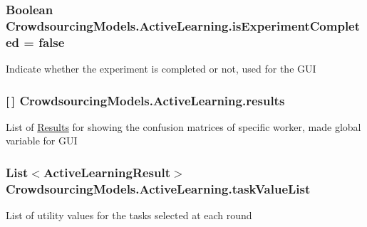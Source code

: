 \subsubsection[{is\+Experiment\+Completed}]{\setlength{\rightskip}{0pt plus 5cm}Boolean Crowdsourcing\+Models.\+Active\+Learning.\+is\+Experiment\+Completed = false\hspace{0.3cm}{\ttfamily [static]}}\label{class_crowdsourcing_models_1_1_active_learning_ac658e48a670fa0f0b7896cf8e2648556}


Indicate whether the experiment is completed or not, used for the G\+U\+I 

\hypertarget{class_crowdsourcing_models_1_1_active_learning_a4f3abbe012947f48a2476130e2dd9d1e}{}
\subsubsection[{results}]{ \mbox{[}$\,$\mbox{]} Crowdsourcing\+Models.\+Active\+Learning.\+results\hspace{0.3cm}{\ttfamily [static]}}\label{class_crowdsourcing_models_1_1_active_learning_a4f3abbe012947f48a2476130e2dd9d1e}


List of \hyperlink{class_crowdsourcing_models_1_1_results}{Results} for showing the confusion matrices of specific worker, made global variable for G\+U\+I 

\hypertarget{class_crowdsourcing_models_1_1_active_learning_a83a41d494f96fc2fc9d040ebc6587fcc}{}
\subsubsection[{task\+Value\+List}]{\setlength{\rightskip}{0pt plus 5cm}List$<${\bf Active\+Learning\+Result}$>$ Crowdsourcing\+Models.\+Active\+Learning.\+task\+Value\+List\hspace{0.3cm}{\ttfamily [static]}}\label{class_crowdsourcing_models_1_1_active_learning_a83a41d494f96fc2fc9d040ebc6587fcc}


List of utility values for the tasks selected at each round 

